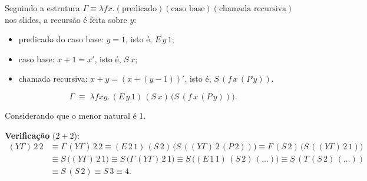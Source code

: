 \begin{solution}
Seguindo a estrutura $\Gamma\equiv\lambda f x.(\text{predicado})(\text{caso base})(\text{chamada recursiva})$
nos slides, a recursão é feita sobre $y$:
\begin{itemize}
    \item predicado do caso base: $y = 1$, isto é, $E\,y\,1$;
    \item caso base: $x + 1 = x'$, isto é, $S\,x$;
    \item chamada recursiva: $x + y = (x + (y-1))'$, isto é, $S\,(f\,x\,(P\,y))$.
\end{itemize}
\[
    \Gamma \;\equiv\; \lambda fxy.\,(E\,y\,1)\,(S\,x)\,\bigl(S\,(f\,x\,(P\,y))\bigr).
\]

Considerando que o menor natural é $1$.

\textbf{Verificação} ($2 + 2$):
\begin{align*}
    (Y\Gamma)\,2\,2 &\equiv \Gamma\,(Y\Gamma)\,2\,2
        \equiv (E\,2\,1)\,(S\,2)\,\bigl(S\,((Y\Gamma)\,2\,(P\,2))\bigr)
        \equiv F\,(S\,2)\,\bigl(S\,((Y\Gamma)\,2\,1)\bigr) \\
    &\equiv S\,\bigl((Y\Gamma)\,2\,1\bigr)
        \equiv S\,\bigl(\Gamma\,(Y\Gamma)\,2\,1\bigr)
        \equiv S\,\bigl((E\,1\,1)\,(S\,2)\,(\ldots)\bigr)
        \equiv S\,(T\,(S\,2)\,(\ldots)) \\
    &\equiv S\,(S\,2) \equiv S\,3 \equiv 4.
\end{align*}

\end{solution}


